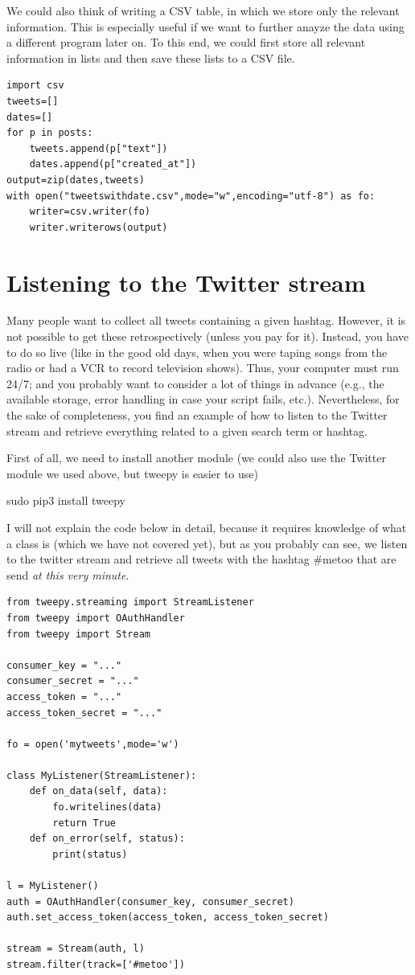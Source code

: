 \documentclass[a4paper,12pt]{book}
\begin{document}
We could also think of writing a CSV table, in which we store only the relevant information. This is especially useful if we want to further anayze the data using a different program later on. To this end, we could first store all relevant information in lists and then save these lists to a CSV file.


\begin{lstlisting}
import csv
tweets=[]
dates=[]
for p in posts:
	tweets.append(p["text"])
	dates.append(p["created_at"])
output=zip(dates,tweets)
with open("tweetswithdate.csv",mode="w",encoding="utf-8") as fo:
	writer=csv.writer(fo)
	writer.writerows(output) 
\end{lstlisting}


\section{Listening to the Twitter stream}

Many people want to collect all tweets containing a given hashtag.
However, it is not possible to get these retrospectively (unless you pay for it). 
Instead, you have to do so live (like in the good old days, when you were taping songs from the radio or had a VCR to record television shows).
Thus, your computer must run 24/7; and you probably want to consider a lot of things in advance (e.g., the available storage, error handling in case your script fails, etc.).
Nevertheless, for the sake of completeness, you find an example of how to listen to the Twitter stream and retrieve everything related to a given search term or hashtag.

First of all, we need to install another module (we could also use the Twitter module we used above, but tweepy is easier to use)
\begin{lstlistingbash}
sudo pip3 install tweepy
\end{lstlistingbash}	

I will not explain the code below in detail, because it requires knowledge of what a class is (which we have not covered yet), but as you probably can see, we listen to the twitter stream and retrieve all tweets with the hashtag \#metoo that are send \emph{at this very minute}.

\begin{lstlisting}
from tweepy.streaming import StreamListener
from tweepy import OAuthHandler
from tweepy import Stream

consumer_key = "..."
consumer_secret = "..."
access_token = "..."
access_token_secret = "..."

fo = open('mytweets',mode='w')

class MyListener(StreamListener):
    def on_data(self, data):
        fo.writelines(data)
        return True
    def on_error(self, status):
        print(status)

l = MyListener()
auth = OAuthHandler(consumer_key, consumer_secret)
auth.set_access_token(access_token, access_token_secret)

stream = Stream(auth, l)
stream.filter(track=['#metoo'])
\end{lstlisting}
\end{document}

